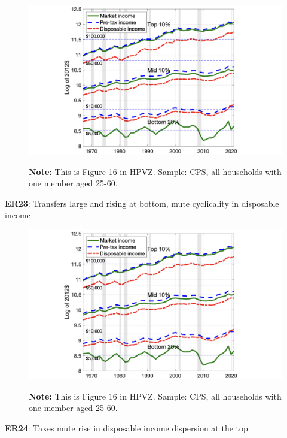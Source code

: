 \documentclass[11pt, aspectratio=169]{beamer}
\begin{document}
\begin{frame}{}
	\begin{figure}
		\includegraphics[scale=0.3]{./figures/inequality_government_1}
	\vspace*{-2mm}
	\begin{flushleft}
		{\scriptsize \hspace{6mm} \textbf{Note:} This is Figure 16 in HPVZ. Sample: CPS, all households with one member aged 25-60.}
	\end{flushleft}	
	\end{figure}

	\vspace{0mm}
	{\color{blue}\textbf{ER23}}: Transfers large and rising at bottom, mute cyclicality in disposable income
\end{frame}


\begin{frame}{}
	\begin{figure}
		\includegraphics[scale=0.3]{./figures/inequality_government_1}
	\vspace*{-2mm}
	\begin{flushleft}
		{\scriptsize \hspace{6mm} \textbf{Note:} This is Figure 16 in HPVZ. Sample: CPS, all households with one member aged 25-60.}
	\end{flushleft}	
	\end{figure}

	\vspace{0mm}
	{\color{blue}\textbf{ER24}}: Taxes mute rise in disposable income dispersion at the top
\end{frame}
\end{document}
